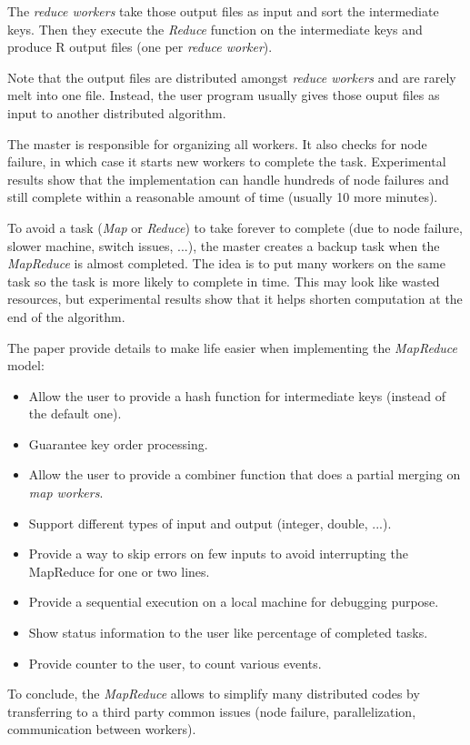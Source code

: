 \documentclass{article}
\begin{document}
The \textit{reduce workers} take those output files as input and sort the intermediate keys.
Then they execute the \textit{Reduce} function on the intermediate keys and produce R output files (one per \textit{reduce worker}).

Note that the output files are distributed amongst \textit{reduce workers} and are rarely melt into one file.
Instead, the user program usually gives those ouput files as input to another distributed algorithm.

The master is responsible for organizing all workers.
It also checks for node failure, in which case it starts new workers to complete the task.
Experimental results show that the implementation can handle hundreds of node failures and still complete within a reasonable amount of time (usually 10 more minutes).

To avoid a task (\textit{Map} or \textit{Reduce}) to take forever to complete (due to node failure, slower machine, switch issues, ...), the master creates a backup task when the \textit{MapReduce} is almost completed.
The idea is to put many workers on the same task so the task is more likely to complete in time.
This may look like wasted resources, but experimental results show that it helps shorten computation at the end of the algorithm.

The paper provide details to make life easier when implementing the \textit{MapReduce} model:
\begin{itemize}
	\item Allow the user to provide a hash function for intermediate keys (instead of the default one).
	\item Guarantee key order processing.
	\item Allow the user to provide a combiner function that does a partial merging on \textit{map workers}.
	\item Support different types of input and output (integer, double, ...).
	\item Provide a way to skip errors on few inputs to avoid interrupting the MapReduce for one or two lines.
	\item Provide a sequential execution on a local machine for debugging purpose.
	\item Show status information to the user like percentage of completed tasks.
	\item Provide counter to the user, to count various events.
\end{itemize}

To conclude, the \textit{MapReduce} allows to simplify many distributed codes by transferring to a third party common issues (node failure, parallelization, communication between workers).
\end{document}
